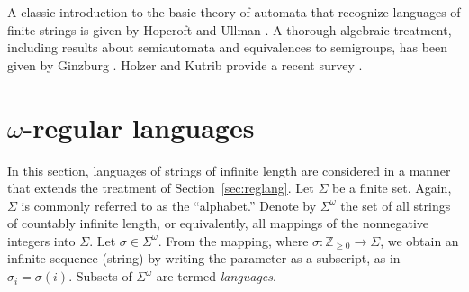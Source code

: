 \documentclass{amsart}
\theoremstyle{plain}
\theoremstyle{definition}
\theoremstyle{definition}
\begin{document}
A classic introduction to the basic theory of automata that recognize languages
of finite strings is given by Hopcroft and Ullman \cite{Hopcroft1979}.  A
thorough algebraic treatment, including results about semiautomata and
equivalences to semigroups, has been given by Ginzburg \cite{Ginzburg1968}.
Holzer and Kutrib provide a recent survey \cite{HolzerK2011}.


\section{$\omega$-regular languages}\label{sec:omegalang}

In this section, languages of strings of infinite length are considered in a
manner that extends the treatment of Section~\ref{sec:reglang}.  Let $\Sigma$ be
a finite set.  Again, $\Sigma$ is commonly referred to as the ``alphabet.''
Denote by $\Sigma^{\omega}$ the set of all strings of countably infinite length,
or equivalently, all mappings of the nonnegative integers into $\Sigma$.  Let
$\sigma \in \Sigma^{\omega}$.  From the mapping, where $\sigma: \mathbb{Z}_{\geq
  0} \rightarrow \Sigma$, we obtain an infinite sequence (string) by writing the
parameter as a subscript, as in $\sigma_i = \sigma(i)$.  Subsets of
$\Sigma^{\omega}$ are termed \textit{languages}.
\end{document}
